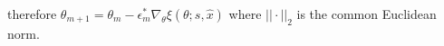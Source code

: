 \documentclass[11pt, a4paper]{article}
\theoremstyle{definition}
\begin{document}
	therefore $\theta_{m+1} = \theta_m - \epsilon_m^* \nabla_{\theta} \xi(\theta; s,\hat x)$
	where $||\cdot||_2$ is the common Euclidean norm.
\end{document}
